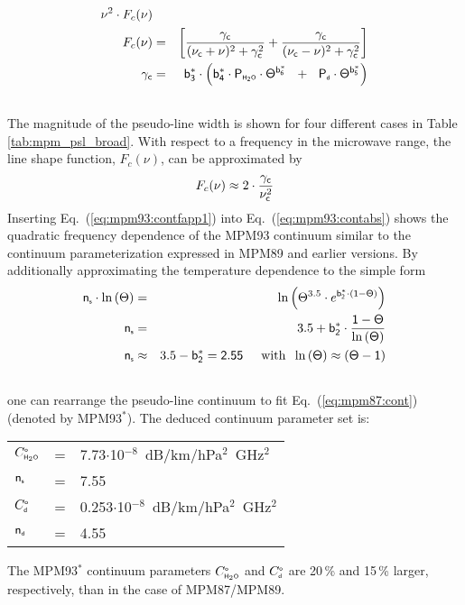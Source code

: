 {\begin{eqnarray}
                \nu^2 \cdot F_c(\nu)\\
%
  \label{eq:mpm93:contabs1}
  F_c(\nu) & = & \left[\frac{\gamc}{(\nucc+\nu)^2+\gamc^2} + 
                       \frac{\gamc}{(\nucc-\nu)^2+\gamc^2}\right]\\
%
  \label{eq:mpm93:contabs2}
  \gamc & = &  \bdks \cdot 
          \left(\bvks \cdot \phzo \cdot \Theta^{\bsks}~~+~~ 
                            \pda  \cdot \Theta^{\bfks}\right)\\
\nonumber
\end{eqnarray}
The magnitude of the pseudo-line width is shown for four different 
cases in Table\,\ref{tab:mpm_psl_broad}. With respect to a frequency
in the microwave range, the line shape function, $F_c(\nu)$, can be 
approximated by
\begin{equation}
 \label{eq:mpm93:contfapp1}
 F_c(\nu) \approx 2 \cdot \frac{\gamma_{\sf c}}{\nu_{\sf c}^2}
\end{equation}
Inserting Eq.~(\ref{eq:mpm93:contfapp1}) into Eq.~(\ref{eq:mpm93:contabs})
shows the quadratic frequency dependence of the MPM93 continuum
similar to the continuum parameterization expressed in MPM89 and earlier 
versions. By additionally approximating the temperature dependence to the 
simple form
\begin{eqnarray}
  \xs\cdot\ln{(\Theta)} & = & 
  \ln{\left(\Theta^{3.5} \cdot e^{\bzks\cdot(1-\Theta)}\right)}\nonumber\\
%
  \xs  & = & 3.5 +
  \bzks\cdot\frac{1-\Theta}{\ln{(\Theta)}}\nonumber\\
%
  \xs & \approx & 3.5 -\bzks = 2.55\hspace*{5mm}\mbox{with}\hspace*{2mm}
                 \ln{(\Theta)}\approx(\Theta-1)\\
\nonumber
\end{eqnarray}
one can rearrange the pseudo-line continuum to fit Eq.~(\ref{eq:mpm87:cont})
(denoted by MPM93$^*$). The deduced continuum parameter set is:
\begin{tabular}{lcl}
 $C^{\mbox{\tiny \sf o}}_{\mbox{\tiny \sf H}_{2}\mbox{\tiny \sf O}}$  & = & 7.73$\cdot$10$^{-8}$~dB/km/hPa$^2$~GHz$^2$\\
 ${\sf n}_{\mbox{\tiny \sf s}}$   & = & 7.55\\
 $C^{\mbox{\tiny \sf o}}_{\mbox{\tiny \sf d}}$  & = & 0.253$\cdot$10$^{-8}$~dB/km/hPa$^2$~GHz$^2$\\ 
 ${\sf n}_{\mbox{\tiny \sf d}}$   & = & 4.55 \\
\end{tabular}
The MPM93$^*$ continuum parameters $C^{\mbox{\tiny \sf o}}_{\mbox{\tiny \sf H}_{2}\mbox{\tiny \sf O}}$ and $C^{\mbox{\tiny \sf o}}_{\mbox{\tiny \sf d}}$ are 20\,\% and 
15\,\% larger, respectively, than in the case of MPM87/MPM89. 
}
